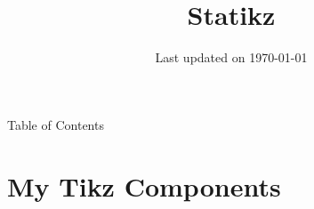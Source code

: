 \documentclass[9pt,svgnames,x11names]{beamer}
\title[\color{black} Statikz\textcolor{staticsRed}{\;2018-\the\year}]{\Huge Statikz}
\subtitle{} %
\institute{\small Source code at: \lb{\footnotesize\url{https://github.com/dmorgorg/LaTeX2022}}}
\author{} %
\date{\small Last updated on \today}
\begin{document}

\begin{frame}[plain]
    \titlepage
\end{frame}


\begin{frame}{Table of Contents}
    \begin{minipage}{0.9\textwidth}
        \tableofcontents
    \end{minipage}
    \vfill

\end{frame}


\section{My Tikz Components}


\end{document}
